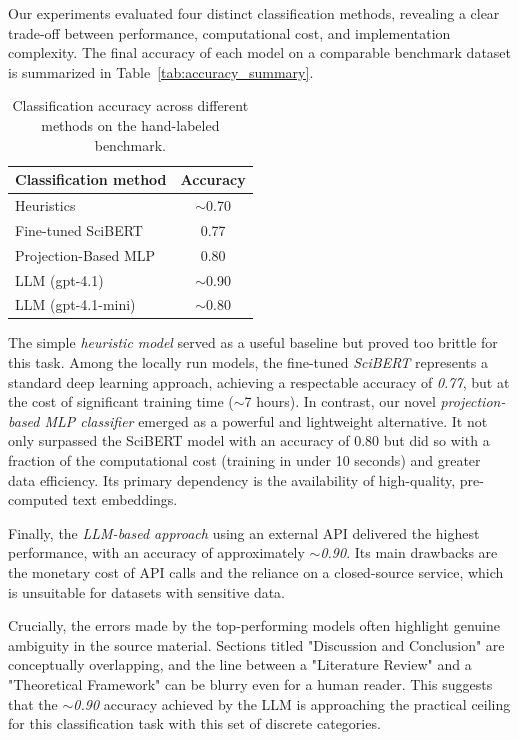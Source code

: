 Our experiments evaluated four distinct classification methods, revealing a clear trade-off between performance, computational cost, and implementation complexity. The final accuracy of each model on a comparable benchmark dataset is summarized in Table~\ref{tab:accuracy_summary}.


\begin{table}%
\centering
\caption{Classification accuracy across different methods on the hand-labeled benchmark.}
\label{tab:accuracy}
\begin{tabular}{lc}
    \toprule
    \textbf{Classification method} & \textbf{Accuracy} \\
    \midrule
    Heuristics             & $\sim$0.70 \\
    \addlinespace
    Fine-tuned SciBERT & 0.77 \\
     Projection-Based MLP & 0.80 \\
    \addlinespace
    LLM (gpt-4.1)          & $\sim$0.90 \\
    LLM (gpt-4.1-mini)     & $\sim$0.80 \\
    \bottomrule
\end{tabular}
\end{table}

The simple \emph{heuristic model} served as a useful baseline but proved too brittle for this task. Among the locally run models, the fine-tuned \emph{SciBERT} represents a standard deep learning approach, achieving a respectable accuracy of \emph{0.77}, but at the cost of significant training time ($\sim$7 hours). In contrast, our novel \emph{projection-based MLP classifier} emerged as a powerful and lightweight alternative. It not only surpassed the SciBERT model with an accuracy of 0.80 but did so with a fraction of the computational cost (training in under 10 seconds) and greater data efficiency. Its primary dependency is the availability of high-quality, pre-computed text embeddings.

Finally, the \emph{LLM-based approach} using an external API delivered the highest performance, with an accuracy of approximately \emph{$\sim$0.90}. Its main drawbacks are the monetary cost of API calls and the reliance on a closed-source service, which is unsuitable for datasets with sensitive data.

Crucially, the errors made by the top-performing models often highlight genuine ambiguity in the source material. Sections titled "Discussion and Conclusion" are conceptually overlapping, and the line between a "Literature Review" and a "Theoretical Framework" can be blurry even for a human reader. This suggests that the \emph{$\sim$0.90} accuracy achieved by the LLM is approaching the practical ceiling for this classification task with this set of discrete categories.

